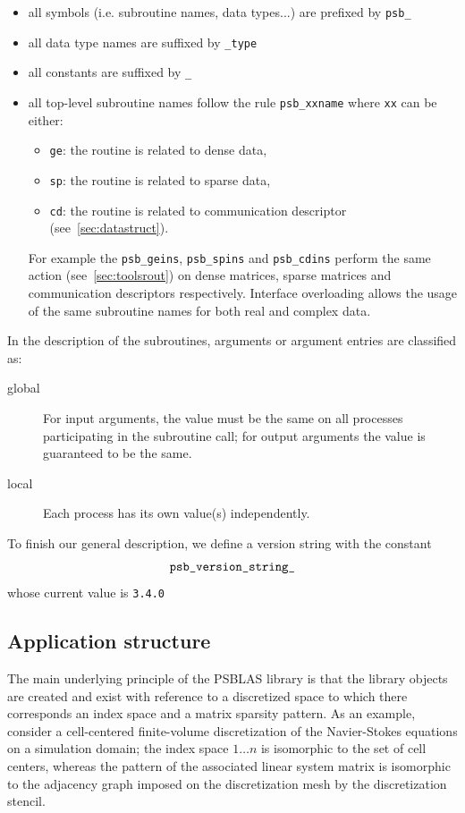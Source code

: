 \begin{itemize}
\item all symbols (i.e. subroutine names, data types...) are
  prefixed by \verb|psb_| 
\item all data type names are suffixed by \verb|_type|
\item all constants are suffixed by \verb|_|
\item all top-level subroutine names follow the rule \verb|psb_xxname| where
  \verb|xx| can be either:
  \begin{itemize}
  \item \verb|ge|: the routine is related to dense data, 
  \item \verb|sp|: the routine is related to sparse data, 
  \item \verb|cd|: the routine is related to communication descriptor
        (see~\ref{sec:datastruct}).
  \end{itemize}
  For example the \verb|psb_geins|, \verb|psb_spins| and
  \verb|psb_cdins| perform the same action (see~\ref{sec:toolsrout}) on
  dense matrices, sparse matrices and communication descriptors
  respectively.
  Interface overloading allows the usage of the same subroutine
  names  for both real and complex data.
\end{itemize}
In the description of the subroutines, arguments or argument entries
are classified as:
\begin{description}
\item[global] For input arguments, the value must be the same on all processes
  participating in the subroutine call; for output arguments the value
  is guaranteed to be the same.
\item[local] Each process has its own value(s) independently.
\end{description}
To finish our general description, we define a version string with the
constant 
\[ \verb|psb_version_string_|\]
whose current value is \verb|3.4.0|

\subsection{Application structure}
\label{sec:appstruct}

The main underlying principle of the PSBLAS library is that the
library objects are created and exist with reference to a discretized
space to which there corresponds an index space and a matrix sparsity
pattern. As an example, consider a cell-centered finite-volume
discretization of  the Navier-Stokes equations on a simulation domain;
the index space $1\dots n$ is isomorphic to the set of cell centers,
whereas the pattern of the associated linear system matrix is
isomorphic to the adjacency graph imposed on the discretization mesh
by the discretization stencil. 


